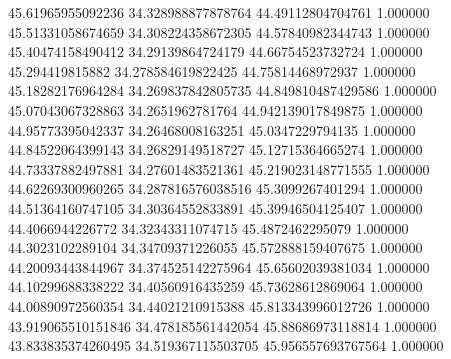45.61965955092236	34.328988877878764	44.49112804704761	1.000000
45.51331058674659	34.308224358672305	44.57840982344743	1.000000
45.40474158490412	34.29139864724179	44.66754523732724	1.000000
45.294419815882	34.278584619822425	44.75814468972937	1.000000
45.18282176964284	34.269837842805735	44.849810487429586	1.000000
45.07043067328863	34.2651962781764	44.942139017849875	1.000000
44.95773395042337	34.26468008163251	45.0347229794135	1.000000
44.84522064399143	34.26829149518727	45.12715364665274	1.000000
44.73337882497881	34.27601483521361	45.219023148771555	1.000000
44.62269300960265	34.287816576038516	45.3099267401294	1.000000
44.51364160747105	34.30364552833891	45.39946504125407	1.000000
44.4066944226772	34.32343311074715	45.4872462295079	1.000000
44.3023102289104	34.34709371226055	45.572888159407675	1.000000
44.20093443844967	34.374525142275964	45.65602039381034	1.000000
44.10299688338222	34.40560916435259	45.73628612869064	1.000000
44.00890972560354	34.44021210915388	45.813343996012726	1.000000
43.919065510151846	34.478185561442054	45.88686973118814	1.000000
43.833835374260495	34.519367115503705	45.956557693767564	1.000000
